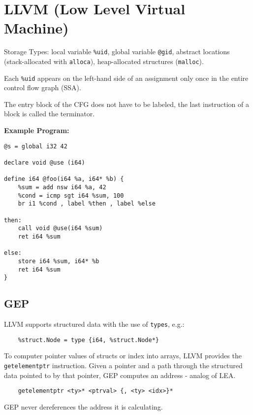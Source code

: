 \section*{LLVM (Low Level Virtual Machine)}

Storage Types: local variable \texttt{\%uid}, global variable \texttt{@gid}, abstract locations (stack-allocated with \texttt{alloca}), heap-allocated structures (\texttt{malloc}).\medskip
	
Each \texttt{\%uid} appears on the left-hand side of an assignment only once in the entire control flow graph (SSA).\medskip
	
The entry block of the CFG does not have to be labeled, the last instruction of a block is called the terminator. \medskip

\textbf{Example Program:}
\begin{lstlisting}
@s = global i32 42

declare void @use (i64)

define i64 @foo(i64 %a, i64* %b) { 
	%sum = add nsw i64 %a, 42
	%cond = icmp sgt i64 %sum, 100
	br i1 %cond , label %then , label %else
	
then:
	call void @use(i64 %sum) 
	ret i64 %sum
	
else:
	store i64 %sum, i64* %b 
	ret i64 %sum
}
\end{lstlisting}

\subsection*{GEP}

LLVM supports structured data with the use of \texttt{types}, e.g.:\medskip

\begin{lstlisting}
	%struct.Node = type {i64, %struct.Node*}
\end{lstlisting}\medskip

To computer pointer values of structs or index into arrays, LLVM provides the \texttt{getelementptr} instruction. Given a pointer and a path through the structured data pointed to by that pointer, GEP computes an address - analog of LEA.\medskip

\begin{lstlisting}
	getelementptr <ty>* <ptrval> {, <ty> <idx>}* 
\end{lstlisting}\medskip
		
GEP never dereferences the address it is calculating.
